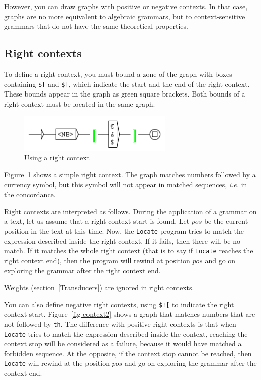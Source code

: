 \bigskip
\noindent However, you can draw graphs with positive or negative contexts. In
that case, graphs are no more equivalent to algebraic grammars, but to context-sensitive
grammars that do not have the same theoretical properties.

\subsection{Right contexts}
\index{\verb+$[+}
\index{\verb+$]+}
To define a right context, you must bound a zone of the graph with boxes
containing \verb+$[+ and \verb+$]+, which indicate the start and the end of the
right context. These bounds appear in the graph as green square brackets. Both
bounds of a right context must be located in the same graph.

\bigskip
\begin{figure}[!h]
\begin{center}
\includegraphics[width=7.4cm]{resources/img/fig6-12.png}
\caption{Using a right context\label{fig-context1}}
\end{center}
\end{figure}

\bigskip
\noindent Figure~\ref{fig-context1} shows a simple right context. The graph
matches numbers followed by a currency symbol, but this symbol will not appear in
matched sequences, \textit{i.e.} in the concordance.

\bigskip
\noindent Right contexts are interpreted as follows. During the application of a
grammar on a text, let us assume that a right context start is found. Let $pos$ be the
current position in the text at this time. Now, the \verb$Locate$ program tries to match
the expression described inside the right context. If it fails, then there will
be no match. If it matches the whole right context (that is to say if
\verb$Locate$ reaches the right context end), then the program will rewind at
position $pos$ and go on exploring the grammar after the right context
end.

\bigskip
\noindent Weights (section~\ref{Transducers}) are ignored in right contexts.

\bigskip
\noindent You can also define negative right contexts,
using \verb+$![+ to indicate the right context start. Figure~\ref{fig-context2}
shows a graph that matches numbers that are not followed by \verb+th+. The difference
with positive right contexts is that when \verb$Locate$ tries to match the
expression described inside the context, reaching the context stop will be
considered as a failure, because it would have matched a forbidden sequence. At the opposite, if
the context stop cannot be reached, then \verb$Locate$ will rewind at the
position $pos$ and go on exploring the grammar after the context end.

